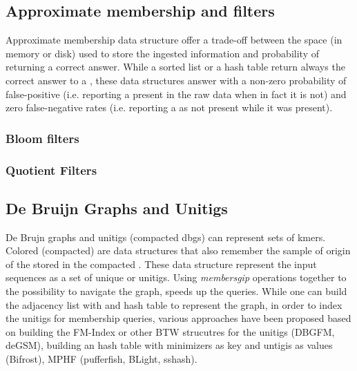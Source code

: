 \subsection{Approximate membership and filters}
Approximate membership data structure offer a trade-off between the space (in memory or disk) used to store the ingested information and probability of returning a correct answer. While a sorted list or a hash table return always the correct answer to a , these data structures answer with a non-zero probability of false-positive (i.e. reporting a \kmer present in the raw data when in fact it is not) and zero false-negative rates (i.e. reporting a \kmer as not present while it was present). 
\subsubsection{Bloom filters}
\subsubsection{Quotient Filters}

\subsection{De Bruijn Graphs and Unitigs}
De Brujn graphs and unitigs (compacted dbgs) can represent sets of kmers. Colored (compacted) \dbg are data structures that also remember the sample of origin of the \kmers stored in the compacted \dbg. These data structure represent the input sequences as a set of unique \kmers or unitigs. Using \emph{membersgip} operations together to the possibility to navigate the graph, speeds up the queries.
While one can build the adjacency list with and hash table to represent the graph, in order to index the unitigs for membership queries, various approaches have been proposed based on building the FM-Index or other BTW strucutres for the unitigs (DBGFM, deGSM), building an hash table with minimizers as key and untigis as values (Bifrost), MPHF (pufferfish, BLight, sshash).


